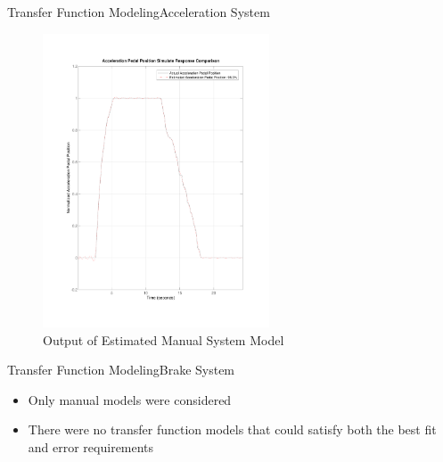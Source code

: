 \documentclass{beamer}
\begin{document}
\begin{frame}{Transfer Function Modeling}{Acceleration System}
\begin{block}{}
\begin{figure}
\begin{minipage}{0.45\textwidth}
        \includegraphics[width=0.6\textwidth]{figs/img/manualAccelTransferFunctionModel} %
        \caption{Output of Estimated Manual System Model}
        \label{fig:manualAccelModel}
    \end{minipage}
\end{figure}
  \end{block}
\end{frame}

\begin{frame}{Transfer Function Modeling}{Brake System}
\begin{block}{}
 \begin{itemize}
	\item Only manual models were considered 
	\item There were no transfer function models that could satisfy both the best fit and error requirements 
 \end{itemize}
  \end{block}
\end{frame}
\end{document}
